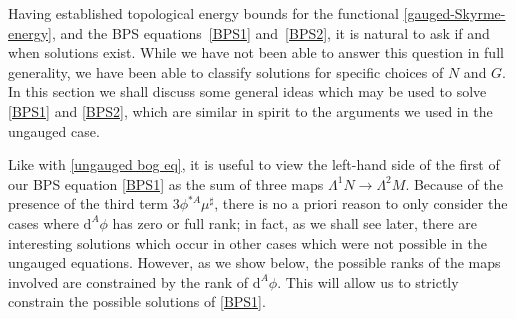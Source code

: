 \documentclass[pdftex]{sigma}
\newcommand{\1}{{\mathbb{1}}}
\def \d{\mathrm{d}}
\numberwithin{equation}{section}
\begin{document}
Having established topological energy bounds for the functional \eqref{gauged-Skyrme-energy}, and the BPS equations~\eqref{BPS1} and~\eqref{BPS2}, it is natural to ask if and when solutions exist. While we have not been able to answer this question in full generality, we have been able to classify solutions for specific choices of $N$ and $G$. In this section we shall discuss some general ideas which may be used to solve \eqref{BPS1} and \eqref{BPS2}, which are similar in spirit to the arguments we used in the ungauged case.

Like with \eqref{ungauged bog eq}, it is useful to view the left-hand side of the first of our BPS equation \eqref{BPS1} as the sum of three maps $\Lambda^1N\to\Lambda^2M$. Because of the presence of the third term $3\phi^{\ast A}\mu^\sharp$, there is no a priori reason to only consider the cases where $\d^A\phi$ has zero or full rank; in fact, as we shall see later, there are interesting solutions which occur in other cases which were not possible in the ungauged equations. However, as we show below, the possible ranks of the maps involved are constrained by the rank of $\d^A\phi$. This will allow us to strictly constrain the possible solutions of \eqref{BPS1}.
\end{document}
